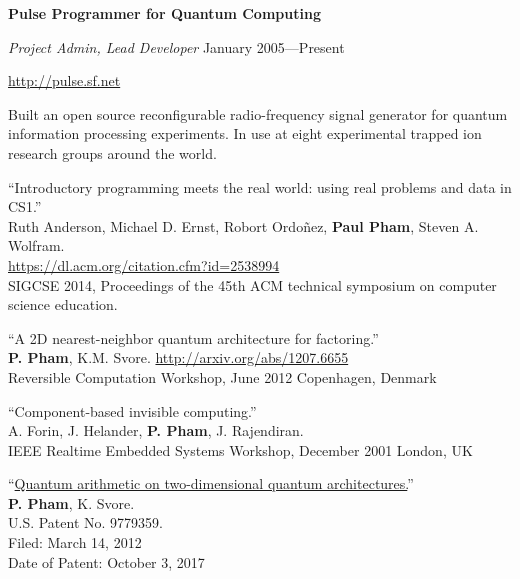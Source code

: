 \documentclass[letter]{article}
\begin{document}
\vspace{\baselineskip}
\par
{\bf {Pulse Programmer for Quantum Computing}}
\par
{\em Project Admin, Lead Developer} \hfill January 2005---Present
\par
\url{http://pulse.sf.net}
\par
Built an open source reconfigurable radio-frequency signal generator
for quantum information processing experiments.
In use at eight experimental trapped ion research groups around the world.

\vspace{\baselineskip}
\par
``Introductory programming meets the real world: using real problems and data in CS1.''
\\
Ruth Anderson, Michael D. Ernst, Robort Ordo\~{n}ez, \textbf{Paul Pham}, Steven A. Wolfram.\\
\url{https://dl.acm.org/citation.cfm?id=2538994}\\
SIGCSE 2014, Proceedings of the 45th ACM technical symposium on computer science education.

\vspace{\baselineskip}
\par
``A 2D nearest-neighbor quantum architecture for factoring.''\\
\textbf{P. Pham}, K.M. Svore. \hfill \url{http://arxiv.org/abs/1207.6655}\\
Reversible Computation Workshop, June 2012 \hfill Copenhagen, Denmark

\vspace{\baselineskip}
\par
``Component-based invisible computing.''\\
A. Forin, J. Helander, \textbf{P. Pham}, J. Rajendiran.\\
IEEE Realtime Embedded Systems Workshop, December 2001 \hfill London, UK


\vspace{\baselineskip}

``\href{https://patents.justia.com/patent/9779359}{Quantum arithmetic on two-dimensional quantum architectures.}''
\\
\textbf{P. Pham}, K. Svore.\\
U.S. Patent No. 9779359.\\
Filed: March 14, 2012\\
Date of Patent: October 3, 2017\\
\end{document}
